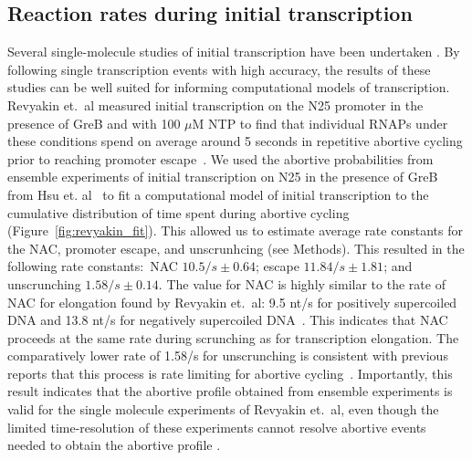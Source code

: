 %
\subsection{Reaction rates during initial transcription}
Several single-molecule studies of initial transcription have been undertaken
\cite{margeat_direct_2006,revyakin_abortive_2006,kapanidis_retention_2005}.
By following single transcription events with high accuracy, the results of
these studies can be well suited for informing computational models of
transcription. Revyakin et.\ al measured initial transcription on the N25
promoter in the presence of GreB and with 100 $\mu$M NTP to find that
individual RNAPs under these conditions spend on average around 5 seconds in
repetitive abortive cycling prior to reaching promoter
escape~\cite{revyakin_abortive_2006}. We used the abortive probabilities from
ensemble experiments of initial transcription on N25 in the presence of GreB
from Hsu et. al~\cite{hsu_initial_2006} to fit a computational model of
initial transcription to the cumulative distribution of time spent during
abortive cycling (Figure~\ref{fig:revyakin_fit}). This allowed us to estimate
average rate constants for the NAC, promoter escape, and unscrunhcing (see
Methods). This resulted in the following rate constants:~NAC $10.5/s \pm
0.64$; escape $11.84/s \pm 1.81$; and unscrunching $1.58/s \pm 0.14$. The
value for NAC is highly similar to the rate of NAC for elongation found by
Revyakin et.\ al: 9.5 nt/s for positively supercoiled DNA and 13.8 nt/s for
negatively supercoiled DNA~\cite{revyakin_abortive_2006}. This indicates that
NAC proceeds at the same rate during scrunching as for transcription
elongation. The comparatively lower rate of 1.58/s for unscrunching is
consistent with previous reports that this process is rate limiting for
abortive cycling~\cite{margeat_direct_2006, revyakin_abortive_2006}.
Importantly, this result indicates that the abortive profile obtained from
ensemble experiments is valid for the single molecule experiments of Revyakin
et.\ al, even though the limited time-resolution of these experiments cannot
resolve abortive events needed to obtain the abortive profile
\cite{revyakin_abortive_2006}.


